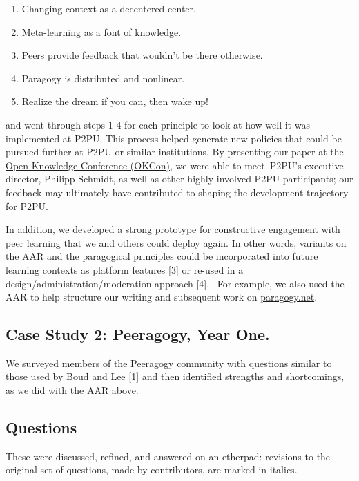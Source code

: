 \begin{enumerate}
\def\labelenumi{\arabic{enumi}.}
\item
  Changing context as a decentered center.
\item
  Meta-learning as a font of knowledge.
\item
  Peers provide feedback that wouldn't be there otherwise.
\item
  Paragogy is distributed and nonlinear.
\item
  Realize the dream if you can, then wake up!
\end{enumerate}

and went through steps 1-4 for each principle to look at how well it was
implemented at P2PU. This process helped generate new policies that
could be pursued further at P2PU or similar institutions. By presenting
our paper at the \href{http://okfn.org/okcon/}{Open Knowledge Conference
(OKCon)}, we were able to meet~P2PU's executive director, Philipp
Schmidt, as well as other highly-involved P2PU participants; our
feedback may ultimately have contributed to shaping the development
trajectory for P2PU.

In addition, we developed a strong prototype for constructive engagement
with peer learning that we and others could deploy again. In other
words, variants on the AAR and the paragogical principles could be
incorporated into future learning contexts as platform features
{{[}3{]}} or re-used in a design/administration/moderation approach
{{[}4{]}}.~ For example, we also used the AAR to help structure our
writing and subsequent work on \href{http://paragogy.net}{paragogy.net}.

\hypertarget{case-study-2-peeragogy-year-one.}{%
\subsection{Case Study 2: Peeragogy, Year
One.}\label{case-study-2-peeragogy-year-one.}}

We surveyed members of the Peeragogy community with questions similar to
those used by Boud and Lee {{[}1{]}} and then identified strengths and
shortcomings, as we did with the AAR above.

\hypertarget{questions}{%
\subsection{Questions}\label{questions}}

These were discussed, refined, and answered on an etherpad: revisions to
the original set of questions, made by contributors, are marked in
italics.


